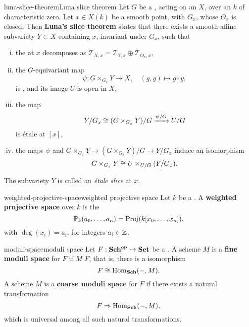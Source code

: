 \begin{topic}{luna-slice-theorem}{Luna slice theorem}
    Let $G$ be a  , acting on an  $X$, over an  $k$ of characteristic zero. Let $x \in X(k)$ be a smooth point, with  $G_x$, whose  $O_x$ is closed. Then \textbf{Luna's slice theorem} states that there exists a smooth affine subvariety $Y \subset X$ containing $x$, invariant under $G_x$, such that
    \begin{enumerate}[(i)]
        \item the  at $x$ decomposes as $\mathcal{T}_{X, x} = \mathcal{T}_{Y, x} \oplus \mathcal{T}_{O_x, x}$,
        \item the $G$-equivariant map
        \[ \psi : G \times_{G_x} Y \to X, \quad (g, y) \mapsto g \cdot y , \]
        is , and its image $U$ is open in $X$,
        \item the map
        \[ Y/G_x \cong (G \times_{G_x} Y) / G \xrightarrow{\psi / G} U / G \]
        is étale at $[x]$,
        \item the maps $\psi$ and $G \times_{G_x} Y \to (G \times_{G_x} Y) / G \to Y / G_x$ induce an isomorphism
        \[ G \times_{G_x} Y \cong U \times_{U/G} (Y/G_x) . \]
    \end{enumerate}
    The subvariety $Y$ is called an \textit{étale slice} at $x$.
\end{topic}

\begin{topic}{weighted-projective-space}{weighted projective space}
    Let $k$ be a . A \textbf{weighted projective space} over $k$ is the 
    \[ \mathbb{P}_k(a_0, \ldots, a_n) = \textup{Proj}(k[x_0, \ldots, x_n]) , \]
    with $\deg(x_i) = a_i$, for integers $a_i \in \mathbb{Z}$.
\end{topic}

\begin{topic}{moduli-space}{moduli space}
    Let $F : \textbf{Sch}^\textup{op} \to \textbf{Set}$ be a .
    A scheme $M$ is a \textbf{fine moduli space} for $F$ if $M$  $F$, that is, there is a  isomorphism
    \[ F \cong \operatorname{Hom}_\textbf{Sch}(-, M) . \]
    A scheme $M$ is a \textbf{coarse moduli space} for $F$ if there exists a natural transformation
    \[ F \Rightarrow \operatorname{Hom}_\textbf{Sch}(-, M) , \]
    which is universal among all such natural transformations.
\end{topic}

